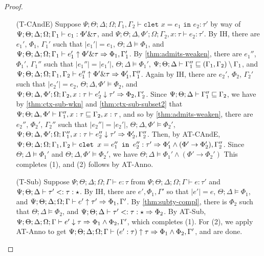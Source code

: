 \begin{proof}
\begin{itemize}
  \item[(T-CAndE)] Suppose
  $\Psi ; \Theta ; \Delta ; \Omega ; \Gamma_1,\Gamma_2 \vdash \texttt{clet } x = e_1 \texttt{ in } e_2 : \tau'$ by way of
  $\Psi ; \Theta ; \Delta ; \Omega ; \Gamma_1 \vdash e_1 : \Phi' \& \tau$, and
  $\Psi ; \Theta ; \Delta, \Phi' ; \Omega ; \Gamma_2, x : \tau \vdash e_2 : \tau'$.
  By IH, there are $e_1'$, $\Phi_1$, $\Gamma_1'$ such that
  $|e_1'| = e_1$,
  $\Theta ; \Delta \vDash \Phi_1$, and
  $\Psi ; \Theta ; \Delta ; \Omega ; \Gamma_1 \vdash e_1' \uparrow \Phi' \& \tau \Rightarrow \Phi_1,\Gamma_1'$.
  By \autoref{thm:admits-weaken}, there are $e_1''$, $\Phi_1'$, $\Gamma_1''$ such that
  $|e_1''| = |e_1'|$,
  $\Theta ; \Delta \vDash \Phi_1'$,
  $\Psi ; \Theta ; \Delta \vdash \Gamma_1'' \sqsubseteq (\Gamma_1,\Gamma_2) \setminus \Gamma_1$, and
  $\Psi ; \Theta ; \Delta ; \Omega ; \Gamma_1,\Gamma_2 \vdash e_1'' \uparrow \Phi' \& \tau \Rightarrow \Phi_1',\Gamma_1''$.
  Again by IH, there are $e_2'$, $\Phi_2$, $\Gamma_2'$ such that
  $|e_2'| = e_2$,
  $\Theta ; \Delta,\Phi' \vDash \Phi_2$, and
  $\Psi ; \Theta ; \Delta,\Phi' ; \Omega ; \Gamma_2,x : \tau \vdash e_2' \downarrow \tau' \Rightarrow \Phi_2,\Gamma_2'$.
  Since
  $\Psi ; \Theta ; \Delta \vdash \Gamma_1'' \sqsubseteq \Gamma_2$, we have by \autoref{thm:ctx-sub-wkn} and \autoref{thm:ctx-sub-subset2}
  that
  $\Psi ; \Theta ; \Delta,\Phi' \vdash \Gamma_1'',x : \tau \sqsubseteq \Gamma_2,x : \tau$,
  and so by \autoref{thm:admits-weaken}, there are $e_2''$, $\Phi_2'$, $\Gamma_2''$ such that
  $|e_2''| = |e_2'|$,
  $\Theta ; \Delta, \Phi' \vDash \Phi_2'$,
  $\Psi ; \Theta ; \Delta, \Phi' ; \Omega ;\Gamma_1'',x:\tau \vdash e_2'' \downarrow \tau' \Rightarrow \Phi_2',\Gamma_2''$.
  Then, by AT-CAndE,
  $\Psi ; \Theta ; \Delta ; \Omega ; \Gamma_1,\Gamma_2 \vdash \texttt{clet } x = e_1'' \texttt{ in } e_2'' : \tau' \Rightarrow \Phi_1' \wedge (\Phi' \to \Phi_2'),\Gamma_2''$.
  Since $\Theta ; \Delta \vDash \Phi_1'$ and $\Theta ; \Delta, \Phi' \vDash \Phi_2'$,
  we have $\Theta ; \Delta \vDash \Phi_1' \wedge (\Phi' \to \Phi_2')$
  This completes (1), and (2) follows by AT-Anno.
  
  \item[(T-Sub)] Suppose $\Psi ; \Theta ; \Delta ; \Omega ; \Gamma \vdash e : \tau$ from $\Psi ; \Theta ; \Delta ; \Omega ; \Gamma \vdash e : \tau'$ and $\Psi;\Theta;\Delta \vdash \tau' <: \tau : \star$. By IH, there are $e',\Phi_1,\Gamma'$ so that $|e'| = e$, $\Theta ; \Delta \vDash \Phi_1$, and $\Psi ; \Theta ; \Delta ; \Omega ; \Gamma \vdash e' \uparrow \tau' \Rightarrow \Phi_1,\Gamma'$. By \autoref{thm:subty-compl}, there is $\Phi_2$ such that $\Theta ; \Delta \vDash \Phi_2$, and $\Psi ; \Theta ; \Delta \vdash \tau' <: \tau : \star \Rightarrow \Phi_2$. By AT-Sub, $\Psi ; \Theta ; \Delta ; \Omega ; \Gamma \vdash e' \downarrow \tau \Rightarrow \Phi_1 \wedge \Phi_2,\Gamma'$, which completes (1). For (2), we apply AT-Anno to get $\Psi ; \Theta ; \Delta ; \Omega ; \Gamma \vdash (e' : \tau) \uparrow \tau \Rightarrow \Phi_1 \wedge \Phi_2,\Gamma'$, and are done.
  

\end{itemize}
\end{proof}
